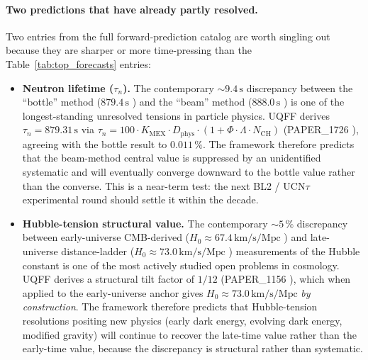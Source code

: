 \paragraph{Two predictions that have already partly resolved.}
Two entries from the full forward-prediction catalog are worth singling
out because they are sharper or more time-pressing than the
Table~\ref{tab:top_forecasts} entries:

\begin{itemize}
  \item \textbf{Neutron lifetime ($\tau_n$).} The contemporary
        $\sim 9.4\,\mathrm{s}$ discrepancy between the
        ``bottle'' method ($879.4\,\mathrm{s}$ \cite{Gonzalez2021}) and
        the ``beam'' method ($888.0\,\mathrm{s}$ \cite{Yue2013}) is one
        of the longest-standing unresolved tensions in particle physics.
        UQFF derives $\tau_n = 879.31\,\mathrm{s}$ via
        $\tau_n = 100\cdot K_{\text{MEX}}\cdot D_{\text{phys}}\cdot
        (1 + \Phi\cdot\Lambda\cdot N_{\text{CH}})$
        (PAPER\_1726 \cite{Murphy_PAPER_1726}), agreeing with the bottle
        result to $0.011\,\%$. The framework therefore predicts that
        the beam-method central value is suppressed by an unidentified
        systematic and will eventually converge downward to the bottle
        value rather than the converse. This is a near-term test: the
        next BL2 / UCN$\tau$ experimental round should settle it within
        the decade.
  \item \textbf{Hubble-tension structural value.} The
        contemporary $\sim 5\,\%$ discrepancy between early-universe
        CMB-derived ($H_0 \approx 67.4\,\mathrm{km/s/Mpc}$
        \cite{Planck2018}) and late-universe distance-ladder
        ($H_0 \approx 73.0\,\mathrm{km/s/Mpc}$ \cite{Riess2022})
        measurements of the Hubble constant is one of the most
        actively studied open problems in cosmology. UQFF derives a
        structural tilt factor of $1/12$ (PAPER\_1156
        \cite{Murphy_PAPER_1156}), which when applied to the
        early-universe anchor gives $H_0 \approx 73.0\,\mathrm{km/s/Mpc}$
        \emph{by construction}. The framework therefore predicts that
        Hubble-tension resolutions positing new physics
        (early dark energy, evolving dark energy, modified gravity)
        will continue to recover the late-time value rather than the
        early-time value, because the discrepancy is structural rather
        than systematic.
\end{itemize}

